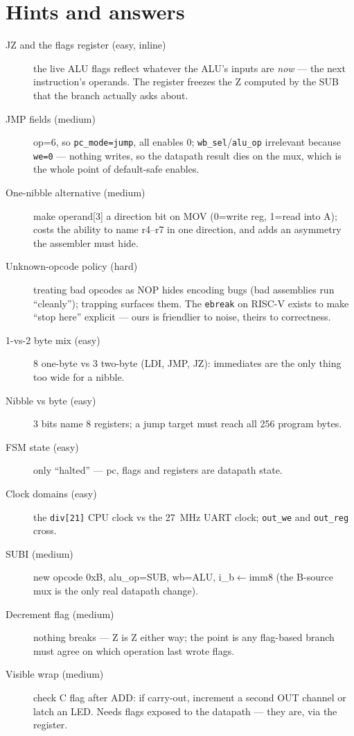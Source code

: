 \section*{Hints and answers}
\begin{description}
\item[JZ and the flags register (easy, inline)] the live ALU flags
reflect whatever the ALU's inputs are \emph{now} --- the next
instruction's operands. The register freezes the Z computed by the
SUB that the branch actually asks about.
\item[JMP fields (medium)] op=6, so \texttt{pc\_mode=jump}, all
enables 0; \texttt{wb\_sel}/\texttt{alu\_op} irrelevant because
\texttt{we=0} --- nothing writes, so the datapath result dies on the
mux, which is the whole point of default-safe enables.
\item[One-nibble alternative (medium)] make operand[3] a direction
bit on MOV (0=write reg, 1=read into A); costs the ability to name
r4--r7 in one direction, and adds an asymmetry the assembler must
hide.
\item[Unknown-opcode policy (hard)] treating bad opcodes as NOP
hides encoding bugs (bad assemblies run ``cleanly''); trapping
surfaces them. The
\texttt{ebreak} on RISC-V exists to make ``stop here'' explicit ---
ours is friendlier to noise, theirs to correctness.
\item[1-vs-2 byte mix (easy)] 8 one-byte vs 3 two-byte (LDI, JMP,
JZ): immediates are the only thing too wide for a nibble.
\item[Nibble vs byte (easy)] 3 bits name 8 registers; a jump target
must reach all 256 program bytes.
\item[FSM state (easy)] only ``halted'' --- pc, flags and registers
are datapath state.
\item[Clock domains (easy)] the \texttt{div[21]} CPU clock vs the
27~MHz UART clock; \texttt{out\_we} and \texttt{out\_reg} cross.
\item[SUBI (medium)] new opcode 0xB, alu\_op=SUB, wb=ALU,
i\_b$\leftarrow$imm8 (the B-source mux is the only real datapath
change).
\item[Decrement flag (medium)] nothing breaks --- Z is Z either way;
the point is any flag-based branch must agree on which operation
last wrote flags.
\item[Visible wrap (medium)] check C flag after ADD: if carry-out,
increment a second OUT channel or latch an LED. Needs flags exposed
to the datapath --- they are, via the register.

\end{description}
